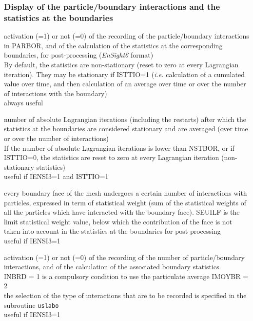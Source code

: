 \subsubsection{Display of the particle/boundary interactions and the statistics at the boundaries}

{activation (=1) or not (=0) of the recording of the particle/boundary
interactions in  PARBOR, and of the calculation of the
statistics at the corresponding boundaries, for post-processing
(\textit{EnSight6} format)\\
By default, the statistics are non-stationary (reset to zero at every
Lagrangian iteration). They may be stationary if ISTTIO=1 ({\em i.e.}
calculation of a cumulated value over time, and then calculation of an
average over time or over the number of interactions with the boundary)\\
always useful}

{number of absolute Lagrangian iterations (including the restarts)
after which the statistics at the boundaries are considered stationary and are
averaged (over time or over the number of interactions)\\
If the number of absolute Lagrangian iterations is lower than NSTBOR, or if
ISTTIO=0, the statistics are reset to zero at every Lagrangian iteration
(non-stationary statistics)\\
useful if IENSI3=1 and ISTTIO=1}

{every boundary face of the mesh undergoes a certain number of
interactions with particles, expressed in term of statistical weight
(sum of the statistical weights of all the particles which have
interacted with the boundary face). SEUILF is
the limit statistical weight value, below which the contribution of the
face is not taken into account in the
statistics at the boundaries for post-processing\\
useful if IENSI3=1}

{activation (=1) or not (=0) of the recording of the number of particle/boundary
interactions, and of the calculation of the associated boundary statistics.\\
INBRD = 1 is a compulsory condition to use the particulate average
IMOYBR = 2\\
the selection of the type of interactions that are to be recorded is specified
in the subroutine \texttt{uslabo}\\
useful if IENSI3=1}


